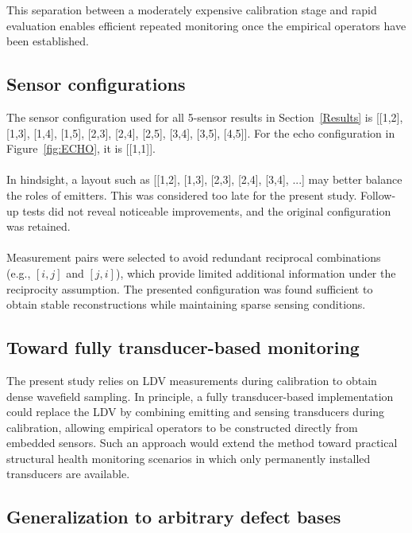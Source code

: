 \documentclass[a4paper,fleqn]{cas-sc}
\begin{document}
This separation between a moderately expensive calibration stage and rapid evaluation enables efficient repeated monitoring once the empirical operators have been established.

\subsection{Sensor configurations}
\label{Appendix_Sensors}
The sensor configuration used for all 5-sensor results in Section~\ref{Results} is
[[1,2], [1,3], [1,4], [1,5], [2,3], [2,4], [2,5], [3,4], [3,5], [4,5]].
For the echo configuration in Figure~\ref{fig:ECHO}, it is [[1,1]].
\paragraph{}
In hindsight, a layout such as [[1,2], [1,3], [2,3], [2,4], [3,4], ...] may better balance the roles of emitters. This was considered too late for the present study. Follow-up tests did not reveal noticeable improvements, and the original configuration was retained.
\paragraph{}
Measurement pairs were selected to avoid redundant reciprocal combinations (e.g., $[i,j]$ and $[j,i]$), which provide limited additional information under the reciprocity assumption. The presented configuration was found sufficient to obtain stable reconstructions while maintaining sparse sensing conditions.

\subsection{Toward fully transducer-based monitoring}
\label{Appendix_Transducers}

The present study relies on LDV measurements during calibration to obtain dense wavefield sampling. In principle, a fully transducer-based implementation could replace the LDV by combining emitting and sensing transducers during calibration, allowing empirical operators to be constructed directly from embedded sensors. Such an approach would extend the method toward practical structural health monitoring scenarios in which only permanently installed transducers are available.

\subsection{Generalization to arbitrary defect bases}
\label{Appendix_Basis}
\end{document}
